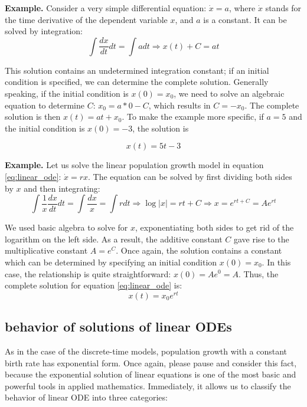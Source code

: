 \documentclass[
  letterpaper,
  DIV=11,
  numbers=noendperiod]{scrreprt}
\begin{document}
\textbf{Example.} Consider a very simple differential equation:
\(\dot x = a\), where \(\dot x\) stands for the time derivative of the
dependent variable \(x\), and \(a\) is a constant. It can be solved by
integration:
\[ \int \frac{dx}{dt} dt  = \int a dt  \Rightarrow x(t) + C = at \]

This solution contains an undetermined integration constant; if an
initial condition is specified, we can determine the complete solution.
Generally speaking, if the initial condition is \(x(0) = x_0\), we need
to solve an algebraic equation to determine \(C\): \(x_0 = a*0 - C\),
which results in \(C = -x_0\). The complete solution is then
\(x(t) = at + x_0\). To make the example more specific, if \(a = 5\) and
the initial condition is \(x(0) = -3\), the solution is

\[x(t) = 5t -3\]

\textbf{Example.} Let us solve the linear population growth model in
equation \ref{eq:linear_ode}: \(\dot x = rx\). The equation can be
solved by first dividing both sides by \(x\) and then integrating:
\[ \int \frac{1}{x} \frac{d x}{dt}  dt = \int \frac{dx}{x} = \int r dt \Longrightarrow \log |x| = rt + C  \Longrightarrow  x =  e^{rt+C} = Ae^{rt}\]

We used basic algebra to solve for \(x\), exponentiating both sides to
get rid of the logarithm on the left side. As a result, the additive
constant \(C\) gave rise to the multiplicative constant \(A=e^C\). Once
again, the solution contains a constant which can be determined by
specifying an initial condition \(x(0) = x_0\). In this case, the
relationship is quite straightforward: \(x(0) = A e^0 = A\). Thus, the
complete solution for equation \ref{eq:linear_ode} is:
\[ x(t) = x_0e^{rt}\]

\hypertarget{behavior-of-solutions-of-linear-odes}{%
\subsection{behavior of solutions of linear
ODEs}\label{behavior-of-solutions-of-linear-odes}}

As in the case of the discrete-time models, population growth with a
constant birth rate has  exponential form.
Once again, please pause and consider this fact, because the exponential
solution of linear equations is one of the most basic and powerful tools
in applied mathematics. Immediately, it allows us to classify the
behavior of linear ODE into three categories:
\end{document}

